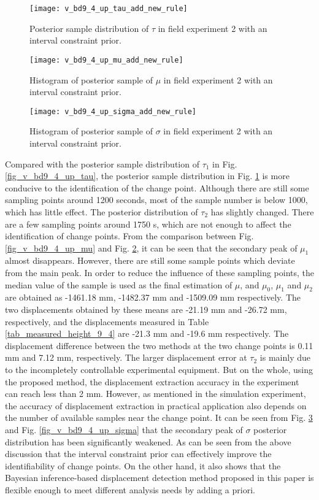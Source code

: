 \documentclass[journal]{IEEEtran}
\begin{document}
\begin{figure}[htbp]
	\centering
	\texttt{[image: v\_bd9\_4\_up\_tau\_add\_new\_rule]}
	\caption{Posterior sample distribution of $\tau$ in field experiment 2 with an interval constraint prior.}
	\label{fig_v_bd9_4_up_tau_add_new_rule}
\end{figure} 
\begin{figure}[htbp]
	\centering
	\texttt{[image: v\_bd9\_4\_up\_mu\_add\_new\_rule]}
	\caption{Histogram of posterior sample of $\mu$ in field experiment 2 with an interval constraint prior.}
	\label{fig_v_bd9_4_up_mu_add_new_rule}
\end{figure} 
\begin{figure}[htbp]
	\centering
	\texttt{[image: v\_bd9\_4\_up\_sigma\_add\_new\_rule]}
	\caption{Histogram of posterior sample of $\sigma$ in field experiment 2 with an interval constraint prior.}
	\label{fig_v_bd9_4_up_sigma_add_new_rule}
\end{figure}
Compared with the posterior sample distribution of $\tau_1$ in Fig. \ref{fig_v_bd9_4_up_tau}, the posterior sample distribution in Fig. \ref{fig_v_bd9_4_up_tau_add_new_rule} is more conducive to the identification of the change point.
Although there are still some sampling points around 1200 seconds, most of the sample number is below 1000, which has little effect.
The posterior distribution of $\tau_2$ has slightly changed. 
There are a few sampling points around 1750 s, which are not enough to affect the identification of change points.
From the comparison between Fig. \ref{fig_v_bd9_4_up_mu} and Fig. \ref{fig_v_bd9_4_up_mu_add_new_rule}, it can be seen that the secondary peak of $\mu_1$ almost disappears.
However, there are still some sample points which deviate from the main peak.
In order to reduce the influence of these sampling points, the median value of the sample is used as the final estimation of \textbf{$\mu$}, and $\mu_0$, $\mu_1$ and $\mu_2$ are obtained as -1461.18 mm, -1482.37 mm and -1509.09 mm respectively.
The two displacements obtained by these means are -21.19 mm and -26.72 mm, respectively, and the displacements measured in Table \ref{tab_measured_height_9_4} are -21.3 mm and -19.6 mm respectively.  
The displacement difference between the two methods at the two change points is 0.11 mm and 7.12 mm, respectively. 
The larger displacement error at $\tau_2$ is mainly due to the incompletely controllable experimental equipment. 
But on the whole, using the proposed method, the displacement extraction accuracy in the experiment can reach less than 2 mm. However, as mentioned in the simulation experiment, the accuracy of displacement extraction in practical application also depends on the number of available samples near the change point.
It can be seen from Fig. \ref{fig_v_bd9_4_up_sigma_add_new_rule} and Fig. \ref{fig_v_bd9_4_up_sigma} that the secondary peak of $\sigma$ posterior distribution has been significantly weakened.
As can be seen from the above discussion that the interval constraint prior can effectively improve the identifiability of change points.
On the other hand, it also shows that the Bayesian inference-based displacement detection method proposed in this paper is flexible enough to meet different analysis needs by adding a priori.
\end{document}
